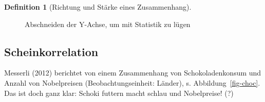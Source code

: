 \documentclass[
  a4paper,
  DIV=11]{scrreprt}
\theoremstyle{definition}
\theoremstyle{definition}
\theoremstyle{definition}
\newtheorem{definition}{Definition}[chapter]
\theoremstyle{remark}
\begin{document}
\begin{definition}[Richtung und Stärke eines
Zusammenhang]
\begin{figure}
\begin{minipage}{0.50\linewidth}
{}


\end{minipage}%
%
\begin{minipage}{0.50\linewidth}



\end{minipage}%

\caption{\label{fig-lie2}Abschneiden der Y-Achse, um mit Statistik zu
lügen}

\end{figure}%

\subsection{Scheinkorrelation}\label{scheinkorrelation}

Messerli (2012) berichtet von einem Zusammenhang von Schokoladenkonsum
und Anzahl von Nobelpreisen (Beobachtungseinheit: Länder), s.
Abbildung~\ref{fig-choc}. Das ist doch ganz klar: Schoki futtern macht
schlau und Nobelpreise! (?)

\begin{figure}

\end{figure}
\end{definition}
\end{document}

